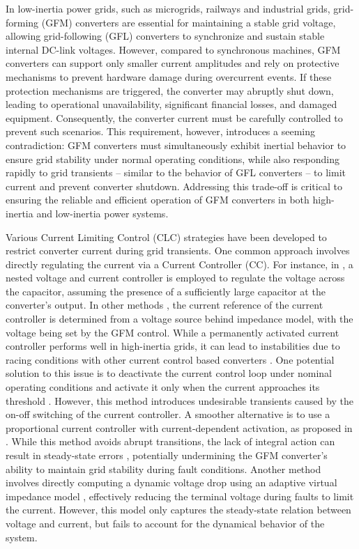\documentclass[lettersize,journal]{IEEEtran}
\begin{document}
In low-inertia power grids, such as microgrids, railways and industrial grids, grid-forming (GFM) converters are essential for maintaining a stable grid voltage, allowing grid-following (GFL) converters to synchronize and sustain stable internal DC-link voltages.
However, compared to synchronous machines, GFM converters can support only smaller current amplitudes and rely on protective mechanisms to prevent hardware damage during overcurrent events.
If these protection mechanisms are triggered, the converter may abruptly shut down, leading to operational unavailability, significant financial losses, and damaged equipment.
Consequently, the converter current must be carefully controlled to prevent such scenarios.
This requirement, however, introduces a seeming contradiction: GFM converters must simultaneously exhibit inertial behavior to ensure grid stability under normal operating conditions, while also responding rapidly to grid transients -- similar to the behavior of GFL converters -- to limit current and prevent converter shutdown.
Addressing this trade-off is critical to ensuring the reliable and efficient operation of GFM converters in both high-inertia and low-inertia power systems.

Various Current Limiting Control (CLC) strategies have been developed to restrict converter current during grid transients.
One common approach involves directly regulating the current via a Current Controller (CC).
For instance, in \cite{rocabert2012control}, a nested voltage and current controller is employed to regulate the voltage across the capacitor, assuming the presence of a sufficiently large capacitor at the converter's output.
In other methods \cite{huang2021impact}, the current reference of the current controller is determined from a voltage source behind impedance model, with the voltage being set by the GFM control.
While a permanently activated current controller performs well in high-inertia grids, it can lead to instabilities due to racing conditions with other current control based converters \cite{taul2019current}.
One potential solution to this issue is to deactivate the current control loop under nominal operating conditions and activate it only when the current approaches its threshold \cite{ndreko2018gfm_paper}.
However, this method introduces undesirable transients caused by the on-off switching of the current controller.
A smoother alternative is to use a proportional current controller with current-dependent activation, as proposed in \cite{wu2024design}. 
While this method avoids abrupt transitions, the lack of integral action can result in steady-state errors \cite{baeckeland2024overcurrent}, potentially undermining the GFM converter's ability to maintain grid stability during fault conditions.
Another method involves directly computing a dynamic voltage drop using an adaptive virtual impedance model \cite{wu2021small}, effectively reducing the terminal voltage during faults to limit the current.
However, this model only captures the steady-state relation between voltage and current, but fails to account for the dynamical behavior of the system.
\end{document}
